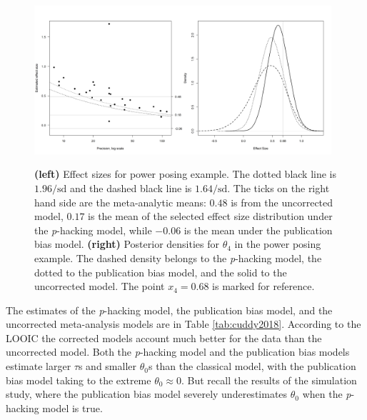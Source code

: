 \documentclass{article}
\theoremstyle{plain}
\theoremstyle{definition}
\begin{document}
\begin{figure}
\noindent \begin{centering}
\includegraphics[width=0.49\textwidth]{plots/cuddy2018}\includegraphics[width=0.49\textwidth]{plots/cuddy2018_posterior}
\par\end{centering}
\caption{\label{fig:cuddy2017} \textbf{(left)} Effect sizes for power posing example. The dotted black line is $1.96/\textrm{sd}$ and the dashed black line is $1.64/\textrm{sd}$. The ticks on the right hand side are
the meta-analytic means: $0.48$ is from the uncorrected model, $0.17$ is the mean of the selected effect size distribution under the \textit{p}-hacking model, while $-0.06$ is the mean under the publication bias model. \textbf{(right)} Posterior densities for $\theta_{4}$ in the power posing example. The dashed density belongs to the \textit{p}-hacking model, the dotted to the publication bias model, and the solid to the uncorrected model. The point $x_{4}=0.68$ is marked for reference.}
\end{figure}

The estimates of the \textit{p}-hacking model, the publication bias model, and the uncorrected meta-analysis models are in Table \ref{tab:cuddy2018}. According to the LOOIC the corrected models account much better for the data than the uncorrected model. Both the \textit{p}-hacking model and the publication bias models estimate
larger $\tau$s and smaller $\theta_{0}$s than the classical model, with the publication bias model taking to the extreme $\theta_{0}\approx0$. But recall the results of the simulation study, where the publication bias model severely underestimates $\theta_0$ when the \textit{p}-hacking model is true.
\end{document}
